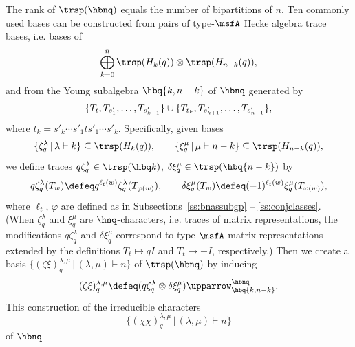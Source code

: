 \label{ss:bnhbnq}

The rank of $\trsp(\hbnq)$ equals the number of bipartitions of $n$.
Ten commonly used bases
can be constructed from pairs of type-$\msfA$
Hecke algebra trace bases, i.e. bases of
\begin{equation*}
  \bigoplus_{k=0}^n \trsp(H_k(q)) \otimes \trsp(H_{n-k}(q)),
\end{equation*}
and from the Young subalgebra
$\hbq{k,n-k}$ of $\hbnq$ generated by
\begin{equation*}
  \{ T_{t}, T_{\smash{s'_{\smash{1}}}}, \dotsc, T_{\smash{s'_{\smash{k-1}}}} \} \cup
  \{ T_{t_k}, T_{\smash{s'_{\smash{k+1}}}}, \dotsc, T_{\smash{s'_{\smash{n-1}}}} \},
\end{equation*}
where $t_k = s'_k \cdots s'_1 t s'_1 \cdots s'_k$.
Specifically, given bases
\begin{equation}\label{eq:basispair1}
  \{ \zeta_q^\lambda \,|\, \lambda \vdash k\}
  \subseteq \trsp(H_k(q)), \qquad
  \{ \xi_q^\mu \,|\, \mu \vdash n-k\}
  \subseteq \trsp(H_{n-k}(q)),
\end{equation}
we define traces
$q\zeta_q^\lambda \in \trsp(\hbq k)$,
$\delta\xi_q^\mu \in \trsp(\hbq{n-k})$ by
\begin{equation*}
  q\zeta_q^\lambda(T_w) \defeq q^{\ell_t(w)}\zeta_q^\lambda(T_{\varphi(w)}),
  \qquad
  \delta\xi_q^\mu(T_w) \defeq (-1)^{\ell_t(w)}\xi_q^\mu(T_{\varphi(w)}),
\end{equation*}
where $\ell_t$, $\varphi$ are defined as in
Subsections~\ref{ss:bnassubgp} -- \ref{ss:conjclasses}.
(When $\zeta^\lambda_q$ and $\xi^\mu_q$ are $\hnq$-characters, i.e. traces of matrix representations,
the modifications $q\zeta^\lambda_q$ and $\delta\xi^\mu_q$
correspond to
type-$\msfA$ matrix representations extended by the definitions
$T_t \mapsto qI$ and $T_t \mapsto -I$, respectively.)
Then we create a basis
$\{ (\zeta\xi)_q^{\lambda,\mu} \,|\, (\lambda,\mu) \vdash n \}$
of $\trsp(\hbnq)$ by
inducing
\begin{equation}\label{eq:inducedpair}
  (\zeta\xi)_q^{\lambda,\mu} \defeq (q\zeta_q^\lambda \otimes \delta\xi_q^\mu)
  \upparrow_{\hbq{k,n-k}}^{\hbnq}.
\end{equation}
This construction of the irreducible characters
\begin{equation*}
  \{ (\chi\chi)^{\lambda,\mu}_q \,|\, (\lambda,\mu) \vdash n \}
  \end{equation*}
of $\hbnq$ 
